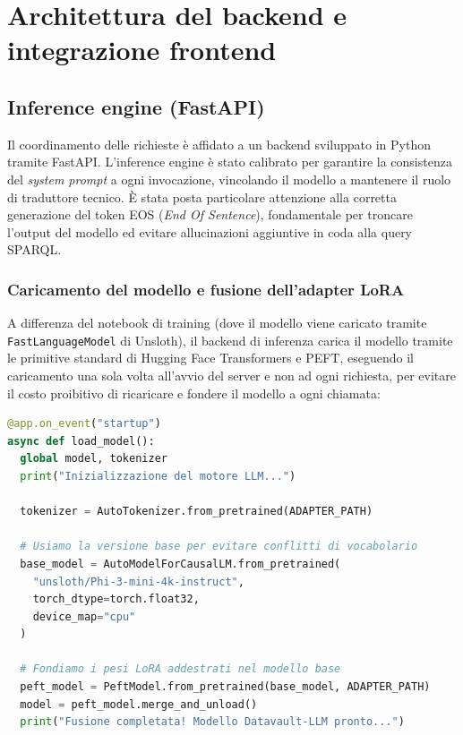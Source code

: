 \documentclass[12pt,a4paper,oneside]{book}
\newcommand{\code}[1]{\colorbox{light-gray}{\texttt{#1}}}
\begin{document}
\section{Architettura del backend e integrazione frontend}\label{sec:backend}


\subsection{Inference engine (FastAPI)}\label{subsec:fastapi}
Il coordinamento delle richieste è affidato a un backend sviluppato in Python tramite FastAPI.\@
L'inference engine è stato calibrato per garantire la consistenza del \textit{system prompt} a ogni invocazione, vincolando il modello a mantenere il ruolo di traduttore tecnico.
È stata posta particolare attenzione alla corretta generazione del token EOS (\textit{End Of Sentence}), fondamentale per troncare l'output del modello ed evitare allucinazioni aggiuntive in coda alla query SPARQL.\@

  \subsubsection{Caricamento del modello e fusione dell'adapter LoRA}

  \begin{sloppypar}
  A differenza del notebook di training (dove il modello viene caricato tramite \code{FastLanguageModel} di Unsloth), il backend di inferenza carica il modello tramite le primitive standard di Hugging Face Transformers e PEFT, eseguendo il caricamento una sola volta all'avvio del server e non ad ogni richiesta, per evitare il costo proibitivo di ricaricare e fondere il modello a ogni chiamata:
  \end{sloppypar}

  \begin{lstlisting}[language=python, caption=Caricamento e fusione dell'adapter LoRA all'avvio del server FastAPI]
@app.on_event("startup")
async def load_model():
  global model, tokenizer
  print("Inizializzazione del motore LLM...")

  tokenizer = AutoTokenizer.from_pretrained(ADAPTER_PATH)

  # Usiamo la versione base per evitare conflitti di vocabolario
  base_model = AutoModelForCausalLM.from_pretrained(
    "unsloth/Phi-3-mini-4k-instruct",
    torch_dtype=torch.float32,
    device_map="cpu"
  )

  # Fondiamo i pesi LoRA addestrati nel modello base
  peft_model = PeftModel.from_pretrained(base_model, ADAPTER_PATH)
  model = peft_model.merge_and_unload()
  print("Fusione completata! Modello Datavault-LLM pronto...")
\end{lstlisting}
\end{document}
